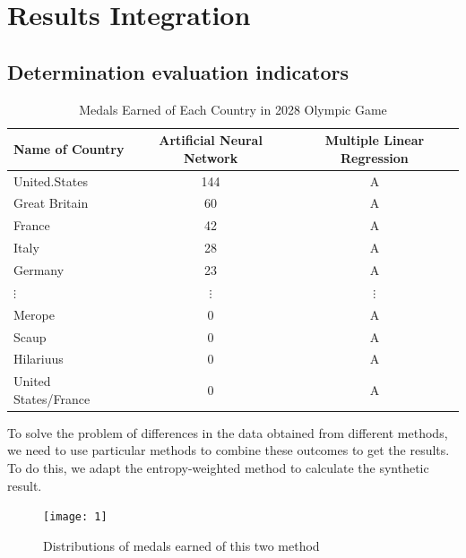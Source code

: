 \documentclass{mcmthesis}
\begin{document}
\section{Results Integration}\label{RestultsIntegration}
\subsection{Determination evaluation indicators}
\begin{table}[H]
\centering 
\label{A}
\caption{Medals Earned of Each Country in 2028 Olympic Game}
\vspace{5pt}
\begin{tabular}{l|c|c}
\hline
Name of Country &Artificial Neural Network & Multiple Linear Regression \\
\hline
United.States & 144 & A\\
Great Britain & 60 & A\\
France & 42 & A\\
Italy & 28 & A\\
Germany & 23 & A\\
$\vdots$ & $\vdots$ & $\vdots$\\
Merope & 0 & A\\
Scaup & 0 & A\\
Hilariuus & 0 & A\\
United States/France & 0 & A\\
\hline
\end{tabular}
\end{table}
To solve the problem of differences in the data obtained from different methods, we need to use particular methods to combine these outcomes to get the results. To do this, we adapt the entropy-weighted method to calculate the synthetic result.
\begin{figure}[h]
  \centering
  \texttt{[image: 1]} %
  \caption{Distributions of medals earned of this two method }
  \label{exampleId}
\end{figure}
\end{document}
